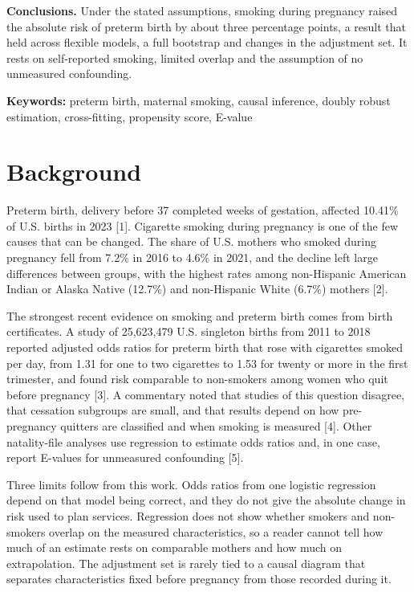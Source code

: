 \documentclass[11pt,letterpaper]{article}
\begin{document}
\textbf{Conclusions.} Under the stated assumptions, smoking during pregnancy raised the absolute risk of preterm birth by about three percentage points, a result that held across flexible models, a full bootstrap and changes in the adjustment set. It rests on self-reported smoking, limited overlap and the assumption of no unmeasured confounding.

\textbf{Keywords:} preterm birth, maternal smoking, causal inference, doubly robust estimation, cross-fitting, propensity score, E-value

\section*{Background}

Preterm birth, delivery before 37 completed weeks of gestation, affected 10.41\% of U.S. births in 2023 [1]. Cigarette smoking during pregnancy is one of the few causes that can be changed. The share of U.S. mothers who smoked during pregnancy fell from 7.2\% in 2016 to 4.6\% in 2021, and the decline left large differences between groups, with the highest rates among non-Hispanic American Indian or Alaska Native (12.7\%) and non-Hispanic White (6.7\%) mothers [2].

The strongest recent evidence on smoking and preterm birth comes from birth certificates. A study of 25,623,479 U.S. singleton births from 2011 to 2018 reported adjusted odds ratios for preterm birth that rose with cigarettes smoked per day, from 1.31 for one to two cigarettes to 1.53 for twenty or more in the first trimester, and found risk comparable to non-smokers among women who quit before pregnancy [3]. A commentary noted that studies of this question disagree, that cessation subgroups are small, and that results depend on how pre-pregnancy quitters are classified and when smoking is measured [4]. Other natality-file analyses use regression to estimate odds ratios and, in one case, report E-values for unmeasured confounding [5].

Three limits follow from this work. Odds ratios from one logistic regression depend on that model being correct, and they do not give the absolute change in risk used to plan services. Regression does not show whether smokers and non-smokers overlap on the measured characteristics, so a reader cannot tell how much of an estimate rests on comparable mothers and how much on extrapolation. The adjustment set is rarely tied to a causal diagram that separates characteristics fixed before pregnancy from those recorded during it.
\end{document}
